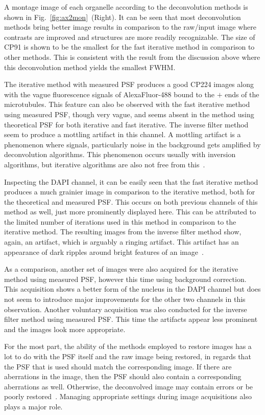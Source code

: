 A montage image of each organelle according to the deconvolution methods is shown in Fig.~\ref{fig:ax2mon}~(Right). 
It can be seen that most deconvolution methods bring better image results in comparison to the raw/input image where contrasts are improved and structures are more readily recognizable. 
The size of CP91 is shown to be the smallest for the fast iterative method in comparison to other methods. 
This is consistent with the result from the discussion above where this deconvolution method yields the smallest FWHM. 

The iterative method with measured PSF produces a good CP224 images along with the vague fluorescence signals of AlexaFluor-488 bound to the $+$ ends of the microtubules. 
This feature can also be observed with the fast iterative method using measured PSF, though very vague, and seems absent in the method using theoretical PSF for both iterative and fast iterative. 
The inverse filter method seem to produce a mottling artifact in this channel. 
A mottling artifact is a phenomenon where signals, particularly noise in the background gets amplified by deconvolution algorithms. 
This phenomenon occurs usually with inversion algorithms, but iterative algorithms are also not free from this~\cite{DecArtif}. 

Inspecting the DAPI channel, it can be easily seen that the fast iterative method produces a much grainier image in comparison to the iterative method, both for the theoretical and measured PSF. 
This occurs on both previous channels of this method as well, just more prominently displayed here. 
This can be attributed to the limited number of iterations used in this method in comparison to the iterative method. 
The resulting images from the inverse filter method show, again, an artifact, which is arguably a ringing artifact. This artifact has an appearance of dark ripples around bright features of an image~\cite{DecArtif}.  

As a comparison, another set of images were also acquired for the iterative method using measured PSF, however this time using background correction. 
This acquisition shows a better form of the nucleus in the DAPI channel but does not seem to introduce major improvements for the other two channels in this observation. 
Another voluntary acquisition was also conducted for the inverse filter method using measured PSF. 
This time the artifacts appear less prominent and the images look more appropriate.

For the most part, the ability of the methods employed to restore images has a lot to do with the PSF itself and the raw image being restored, in regards that the PSF that is used should match the corresponding image. 
If there are aberrations in the image, then the PSF should also contain a corresponding aberrations as well. 
Otherwise, the deconvolved image may contain errors or be poorly restored~\cite{DecArtif}. 
Managing appropriate settings during image acquisitions also plays a major role.

